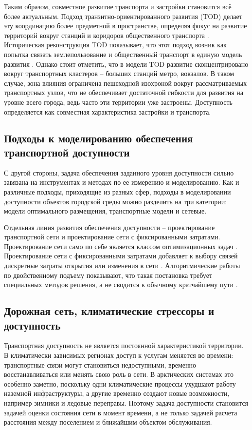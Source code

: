 \documentclass[14pt,a4paper]{extarticle}
\begin{document}
Таким образом, совместное развитие транспорта и застройки становится всё более актуальным. Подход транзитно-ориентированного развития (TOD) делает эту координацию более предметной в пространстве, определяя фокус на развитие территорий вокруг станций и коридоров общественного транспорта \cite{worldbankTod3v}. Историческая реконструкция TOD показывает, что этот подход возник как попытка связать землепользование и общественный транспорт в единую модель развития \cite{carlton2009tod}. Однако стоит отметить, что в модели TOD развитие сконцентрировано вокруг транспортных кластеров -- больших станций метро, вокзалов. В таком случае, зона влияния ограничена пешеходной изохроной вокруг рассматриваемых транспортных узлов, что не обеспечивает достаточной гибкости для развития на уровне всего города, ведь часто эти территории уже застроены. Доступность определяется как совместная характеристика застройки и транспорта.

\subsection*{Подходы к моделированию обеспечения транспортной доступности}

С другой стороны, задача обеспечения заданного уровня доступности сильно завязана на инструментах и методах по ее измерению и моделированию. Как и различные подходы, приходящие из разных сфер, подходы в моделировании доступности объектов городской среды можно разделить на три категории: модели оптимального размещения, транспортные модели и сетевые.

Отдельная линия развития обеспечения доступности -- проектирование транспортной сети и проектирование сети с фиксированными затратами. Проектирование сети само по себе является классом оптимизационных задач \cite{magnanti1984networkDesign}. Проектирование сети с фиксированными затратами добавляет к выбору связей дискретные затраты открытия или изменения в сети \cite{powell1989networkDesign}. Алгоритмические работы по двойственному подъему показывают, что такая постановка требует специальных методов решения, а не сводится к обычному кратчайшему пути \cite{balakrishnan1989dualAscent}.

\subsection*{Дорожная сеть, климатические стрессоры и доступность}

Транспортная доступность не является постоянной характеристикой территории. В климатически зависимых регионах доступ к услугам меняется во времени: транспортные связи могут становиться недоступными, временно восстанавливаться или менять свою роль в сети. В арктических системах это особенно заметно, поскольку одни климатические процессы ухудшают работу наземной инфраструктуры, а другие временно создают новые возможности, например зимники и ледовые переправы. Поэтому задача доступности становится задачей оценки состояния сети в момент времени, а не только задачей расчета расстояния между поселением и ближайшим объектом обслуживания.
\end{document}
